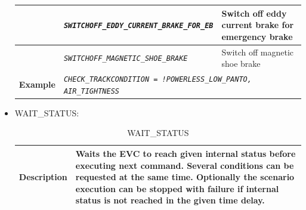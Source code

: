 \begin{itemize}
\begin{longtable}{|l|l|l|}
			\hline

			&	\begin{minipage}[t]{0.45\linewidth} \emph{\texttt{SWITCHOFF\_EDDY\_CURRENT\_BRAKE\_FOR\_EB}} \end{minipage}
			&	\begin{minipage}[t]{0.33\linewidth} Switch off eddy current brake for emergency brake \end{minipage} \\

			\hline

			&	\begin{minipage}[t]{0.45\linewidth} \emph{\texttt{SWITCHOFF\_MAGNETIC\_SHOE\_BRAKE}} \end{minipage}
			&	\begin{minipage}[t]{0.33\linewidth} Switch off magnetic shoe brake \end{minipage} \\

			\hline


				\begin{minipage}[t]{0.22\linewidth} \textbf{Example} \end{minipage}
			&	\multicolumn{2}{l|}{ \begin{minipage}[t]{0.78\linewidth} \emph{\texttt{CHECK\_TRACKCONDITION = !POWERLESS\_LOW\_PANTO, AIR\_TIGHTNESS}} \end{minipage} } \\

		\hline\hline

		\end{longtable}

	\item WAIT\_STATUS:
		\begin{longtable}{|l|l|l|}
			\caption{WAIT\_STATUS}\\
			\hline

				\begin{minipage}[t]{0.22\linewidth} \textbf{Description} \end{minipage}
			&	\multicolumn{2}{l|}{ \begin{minipage}[t]{0.78\linewidth} Waits the EVC to reach given internal status before executing next command. Several conditions can be requested at the same time. Optionally the scenario execution can be stopped with failure if internal status is not reached in the given time delay. \end{minipage} } \\

			\hline


\end{longtable}
\end{itemize}
